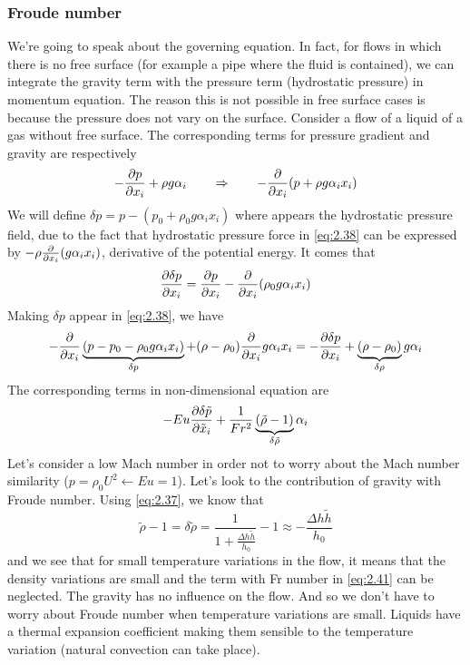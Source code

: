 		\subsubsection{Froude number}
			We're going to speak about the governing equation. In fact, for flows in which there is no free surface (for example a pipe where the fluid is contained), we can integrate the gravity term with the pressure term (hydrostatic pressure) in momentum equation. The reason this is not possible in free surface cases is because the pressure does not vary on the surface. Consider a flow of a liquid of a gas without free surface. The corresponding terms for pressure gradient and gravity are respectively
			\begin{equation}
				-\frac{\partial p}{\partial x_i} + \rho g \alpha _i \qquad \Rightarrow \qquad - \frac{\partial}{\partial x_i} (p + \rho g \alpha _i x_i )
				\label{eq:2.38}
			\end{equation}
			We will define $\delta p = p - (p_0 + \rho _0 g \alpha _i x_i)$ where appears the hydrostatic pressure field, due to the fact that hydrostatic pressure force in \eqref{eq:2.38} can be expressed by $-\rho\frac{\partial}{\partial x_i} ( g \alpha _i x_i)$, derivative of the potential energy. It comes that
			\begin{equation}
				\frac{\partial \delta p}{\partial x_i} = \frac{\partial p}{\partial x_i} - \frac{\partial}{\partial x_i} (\rho _0 g\alpha _i x_i)
			\end{equation}
			Making $\delta p$ appear in \eqref{eq:2.38}, we have
			\begin{equation}
				-\frac{\partial}{\partial x_i} \underbrace{(p - p_0 - \rho _0 g \alpha _i x_i)}_{\delta p} + (\rho - \rho _0) \frac{\partial}{\partial x_i} g\alpha _i x_i = -\frac{\partial \delta p }{\partial x_i} + \underbrace{(\rho - \rho _0)}_{\delta \rho} g \alpha _i
			\end{equation}
			The corresponding terms in non-dimensional equation are 
			\begin{equation}
				-Eu \frac{\partial\delta \tilde{p}}{\partial \tilde{x}_i} +\frac{1}{Fr^2}\underbrace{(\tilde{\rho} - 1)}_{\delta \tilde{\rho}}\alpha _i
				\label{eq:2.41}
			\end{equation}
			Let's consider a low Mach number in order not to worry about the Mach number similarity ($p = \rho _0 U^2 \leftarrow Eu = 1$). Let's look to the contribution of gravity with Froude number. Using \eqref{eq:2.37}, we know that 
			\begin{equation}
				\tilde{\rho} - 1 = \delta \tilde{\rho} = \frac{1}{1+\frac{\Delta h\tilde{h}}{h_0}}-1 \approx -\frac{\Delta h \tilde{h}}{h_0} 
			\end{equation}
			and we see that for small temperature variations in the flow, it means that the density variations are small and the term with Fr number in \eqref{eq:2.41} can be neglected. The gravity has no influence on the flow. And so we don't have to worry about Froude number when temperature variations are small. Liquids have a thermal expansion coefficient making them sensible to the temperature variation (natural convection can take place). \\
			
